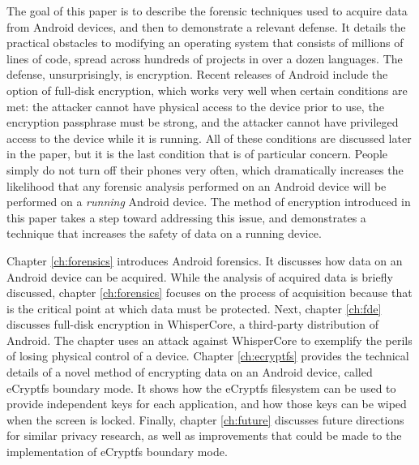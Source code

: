 The goal of this paper is to describe the forensic techniques used to acquire data from Android devices, and
then to demonstrate a relevant defense. It details the practical obstacles to modifying an operating system that consists of
millions of lines of code, spread across hundreds of projects in over a dozen languages.  The defense, unsurprisingly, is
encryption. Recent releases of Android include the option of full-disk encryption, which works very well when certain conditions are
met: the attacker cannot have physical access to the device prior to use, the encryption passphrase must be strong, and the attacker
cannot have privileged access to the device while it is running.  All of these conditions are discussed later in the paper, but it
is the last condition that is of particular concern. People simply do not turn off their phones very often, which dramatically
increases the likelihood that any forensic analysis performed on an Android device will be performed on a \emph{running} Android
device. The method of encryption introduced in this paper takes a step toward addressing this issue, and demonstrates a technique
that increases the safety of data on a running device.

Chapter \ref{ch:forensics} introduces Android forensics. It discusses how data on an Android device can be acquired. While the
analysis of acquired data is briefly discussed, chapter \ref{ch:forensics} focuses on the process of acquisition because that is the
critical point at which data must be protected. Next, chapter \ref{ch:fde} discusses full-disk encryption in WhisperCore, a
third-party distribution of Android. The chapter uses an attack against WhisperCore to exemplify the perils of losing physical
control of a device. Chapter \ref{ch:ecryptfs} provides the technical details of a novel method of encrypting data on an Android
device, called eCryptfs boundary mode. It shows how the eCryptfs filesystem can be used to provide independent keys for each
application, and how those keys can be wiped when the screen is locked.  Finally, chapter \ref{ch:future} discusses future
directions for similar privacy research, as well as improvements that could be made to the implementation of eCryptfs boundary mode.
